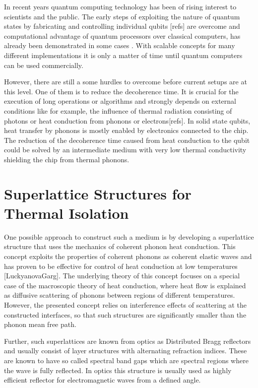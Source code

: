 In recent years quantum computing technology has been of rising
interest to scientists and the public. The early steps of exploiting the nature
of quantum states by fabricating and controlling individual qubits [refs] are
overcome and computational advantage of quantum processors over
classical computers, has already been demonstrated in some cases
\cite{Arute2019}. With scalable concepts for many
different implementations \cite{Cirac2000,Brecht2016,Bluhm2019,Lao2018} it is
only a matter of time until quantum computers can be used commercially.

However, there are still a some hurdles to overcome before current setups are
at this level. One of them is to reduce the decoherence time. It is crucial for
the execution of long operations or algorithms and strongly
depends on external conditions like for example, the influence of thermal
radiation consisting of photons or heat conduction from phonons or
electrons[refs]. In solid state qubits, heat transfer by phonons is mostly
enabled by electronics connected to the chip.
The reduction of the decoherence time caused from heat conduction to the qubit
could be solved by an intermediate medium with very low thermal
conductivity shielding the chip from thermal phonons.

\section{Superlattice Structures for Thermal Isolation}
One possible approach to
construct such a medium is by developing a superlattice structure that
uses the mechanics of coherent phonon heat conduction. This concept exploits
the properties of coherent phonons as coherent elastic waves and has proven
to be effective for control of heat conduction at low temperatures
    [LuckyanovaGarg]. The underlying theory of this concept focuses on a
special case of the macroscopic theory of heat conduction, where heat flow is
explained as diffusive scattering of phonons between regions of different
temperatures.
However, the presented concept relies on interference effects of scattering
at the constructed interfaces, so that such structures are significantly
smaller than the phonon mean free path.

Further, such superlattices are known from optics as Distributed Bragg
reflectors and usually consist of layer structures with alternating refraction
indices. These are known to have so called spectral band gaps which are
spectral regions where the wave is fully reflected.
In optics this structure is usually used as highly efficient reflector for
electromagnetic waves from a defined angle.

